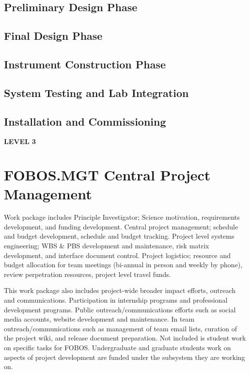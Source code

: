 \documentclass[oneside,11pt]{amsart}
\begin{document}
\subsection{Preliminary Design Phase}
\subsection{Final Design Phase }
\subsection{Instrument Construction Phase}
\subsection{System Testing and Lab Integration}
\subsection{Installation and Commissioning}

\newpage

\begin{center}
{\bf \Large LEVEL 3}
\end{center}

\setcounter{section}{0}

\section{FOBOS.MGT Central Project Management}

Work package includes Principle Investigator; Science motivation,
requirements development, and funding development. Central project
management; schedule and budget development, schedule and budget
tracking. Project level systems engineering; WBS \& PBS development and
maintenance, risk matrix development, and interface document control.
Project logistics; resource and budget allocation for team meetings
(bi-annual in person and weekly by phone), review perpetration
resources, project level travel funds.

This work package also includes project-wide broader impact efforts,
outreach and communications. Participation in internship programs and
professional development programs. Public outreach/communications
efforts such as social media accounts, website development and
maintenance. In team outreach/communications such as management of
team email lists, curation of the project wiki, and release document
preparation. Not included is student work on specific tasks for
FOBOS. Undergraduate and graduate students work on aspects of project
development are funded under the subsystem they are working on.
\end{document}
